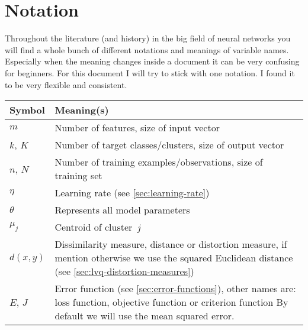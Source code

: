 \section{Notation}\label{sec:notation}
Throughout the literature (and history) in the big field of neural networks you will find a whole bunch of different notations and meanings of variable names. Especially when the meaning changes inside a document it can be very confusing for beginners. For this document I will try to stick with one notation. I found it to be very flexible and consistent.

\begin{tabularx}{\textwidth}{ l X }
Symbol			& Meaning(s) \\ \midrule
$m$				& Number of features, size of input vector \\
$k$, $K$		& Number of target classes/clusters, size of output vector \\
$n$, $N$		& Number of training examples/observations, size of training set \\
$\eta$			& Learning rate (see \ref{sec:learning-rate}) \\
$\theta$		& Represents all model parameters \\

\midrule %
$\mu_j$			& Centroid of cluster~$j$ \\
$d(x, y)$		& Dissimilarity measure, distance or distortion measure, if mention otherwise we use the squared Euclidean distance (see \ref{sec:lvq-distortion-measures}) \\

$E$, $J$		& Error function (see \ref{sec:error-functions}), other names are: loss function, objective function or criterion function\newline
					By default we will use the mean squared error. \\


\end{tabularx}
